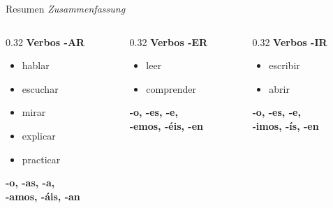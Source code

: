 \documentclass[aspectratio=169, 11pt]{beamer}
\newcommand{\de}[1]{\textit{\textcolor{mittelgrau}{#1}}}
\newcommand{\ender}[1]{\textcolor{endungER}{\textbf{#1}}}
\newcommand{\endir}[1]{\textcolor{endungIR}{\textbf{#1}}}
\newcommand{\endar}[1]{\textcolor{endungAR}{\textbf{#1}}}
\begin{document}
\begin{frame}{Resumen \de{Zusammenfassung}}
    \vspace{0.3cm}

    \begin{columns}[T]
        \begin{column}{0.32\textwidth}
            \textbf{Verbos \endar{-AR}}

            \vspace{0.3cm}

            \begin{itemize}
                \item hablar
                \item escuchar
                \item mirar
                \item explicar
                \item practicar
            \end{itemize}

            \vspace{0.3cm}

            {\small\endar{-o, -as, -a,}\\\endar{-amos, -áis, -an}}
        \end{column}

        \begin{column}{0.32\textwidth}
            \textbf{Verbos \ender{-ER}}

            \vspace{0.3cm}

            \begin{itemize}
                \item leer
                \item comprender
            \end{itemize}

            \vspace{0.7cm}

            {\small\ender{-o, -es, -e,}\\\ender{-emos, -éis, -en}}
        \end{column}

        \begin{column}{0.32\textwidth}
            \textbf{Verbos \endir{-IR}}

            \vspace{0.3cm}

            \begin{itemize}
                \item escribir
                \item abrir
            \end{itemize}

            \vspace{0.7cm}

            {\small\endir{-o, -es, -e,}\\\endir{-imos, -ís, -en}}
        \end{column}
    \end{columns}
\end{frame}
\end{document}
